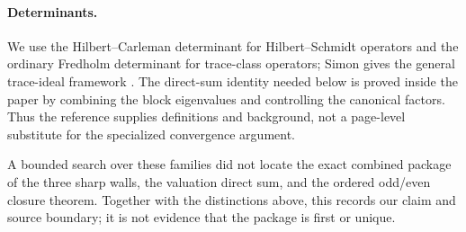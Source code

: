 \paragraph{Determinants.}
We use the Hilbert--Carleman determinant for Hilbert--Schmidt
operators and the ordinary Fredholm determinant for trace-class operators;
Simon gives the general trace-ideal framework
\citep{simon2005trace}.  The direct-sum identity needed below is proved
inside the paper by combining the block eigenvalues and controlling the
canonical factors.  Thus the reference supplies definitions and background,
not a page-level substitute for the specialized convergence argument.

A bounded search over these families did not locate the exact combined
package of the three sharp walls, the valuation direct sum, and the ordered
odd/even closure theorem.  Together with the distinctions above, this records
our claim and source boundary; it is not evidence that the package is first
or unique.
